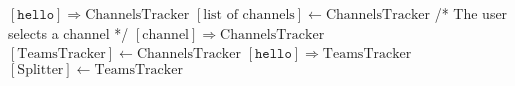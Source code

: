 \documentclass{article}
\begin{document}
\pagestyle{empty}

\newcommand{\send}{\Rightarrow}
\newcommand{\sendto}{\rightarrow}
\algrenewcommand{}
\algrenewcommand\textproc{\textrm}

\begin{algorithmic}
  \State $[\mathtt{hello}] \send \mathrm{ChannelsTracker}$
  \State $[\text{list of channels}] \gets \mathrm{ChannelsTracker}$
  \State /* The user selects a channel */
  \State $[\mathrm{channel}] \send \mathrm{ChannelsTracker}$
  \State $[\mathrm{TeamsTracker}] \gets \mathrm{ChannelsTracker}$
  \State $[\mathtt{hello}] \send \mathrm{TeamsTracker}$
  \State $[\mathrm{Splitter}] \gets \mathrm{TeamsTracker}$
  \EndFunction
\end{algorithmic}
\end{document}
